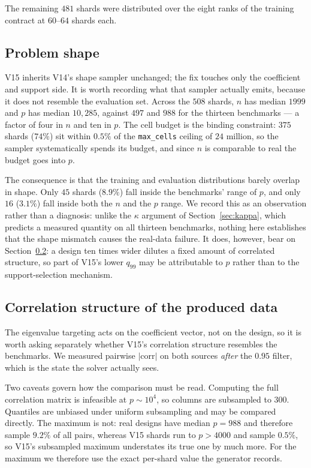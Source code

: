 \documentclass[11pt]{article}
\begin{document}
The remaining $481$ shards were distributed over the eight ranks of the
training contract at $60$--$64$ shards each.

\subsection{Problem shape}
\label{sec:v15shape}

V15 inherits V14's shape sampler unchanged; the fix touches only the
coefficient and support side. It is worth recording what that sampler
actually emits, because it does not resemble the evaluation set. Across the
$508$ shards, $n$ has median $1999$ and $p$ has median $10{,}285$, against
$497$ and $988$ for the thirteen benchmarks --- a factor of four in $n$ and
ten in $p$. The cell budget is the binding constraint: $375$ shards ($74\%$)
sit within $0.5\%$ of the \texttt{max\_cells} ceiling of $24$ million, so the
sampler systematically spends its budget, and since $n$ is comparable to real
the budget goes into $p$.

The consequence is that the training and evaluation distributions barely
overlap in shape. Only $45$ shards ($8.9\%$) fall inside the benchmarks'
range of $p$, and only $16$ ($3.1\%$) fall inside both the $n$ and the $p$
range. We record this as an observation rather than a diagnosis: unlike the
$\kappa$ argument of Section~\ref{sec:kappa}, which predicts a measured
quantity on all thirteen benchmarks, nothing here establishes that the shape
mismatch causes the real-data failure. It does, however, bear on
Section~\ref{sec:v15corr}: a design ten times wider dilutes a fixed amount of
correlated structure, so part of V15's lower $q_{99}$ may be attributable to
$p$ rather than to the support-selection mechanism.

\subsection{Correlation structure of the produced data}
\label{sec:v15corr}

The eigenvalue targeting acts on the coefficient vector, not on the design, so
it is worth asking separately whether V15's correlation structure resembles the
benchmarks. We measured pairwise $|\mathrm{corr}|$ on both sources
\emph{after} the $0.95$ filter, which is the state the solver actually sees.

Two caveats govern how the comparison must be read. Computing the full
correlation matrix is infeasible at $p \sim 10^4$, so columns are subsampled to
$300$. Quantiles are unbiased under uniform subsampling and may be compared
directly. The maximum is not: real designs have median $p = 988$ and therefore
sample $9.2\%$ of all pairs, whereas V15 shards run to $p > 4000$ and sample
$0.5\%$, so V15's subsampled maximum understates its true one by much more.
For the maximum we therefore use the exact per-shard value the generator
records.
\end{document}

